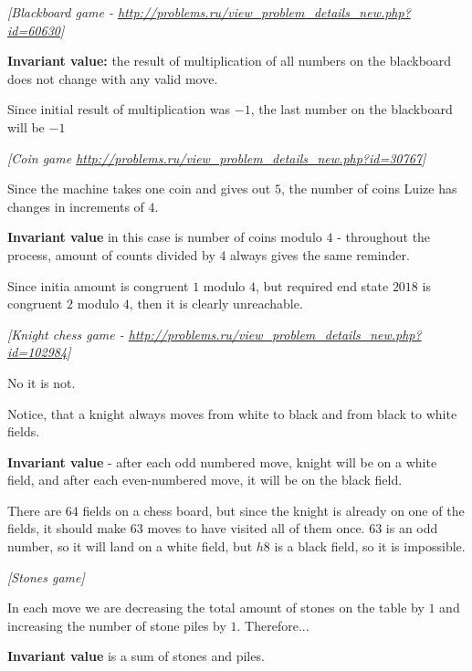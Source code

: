 

%




\noindent 
\filbreak
\begin{problem}
\textit{[Blackboard game - \url{http://problems.ru/view_problem_details_new.php?id=60630}]}

\textbf{Invariant value:} the result of multiplication of all numbers on the blackboard does not change with any valid move. 

Since initial result of multiplication was $-1$, the last number on the blackboard will be $-1$
\end{problem}
%

\begin{problem}
\textit{[Coin game \url{http://problems.ru/view_problem_details_new.php?id=30767}]}

Since the machine takes one coin and gives out $5$, the number of coins Luize has changes in increments of $4$.

\textbf{Invariant value} in this case is number of coins modulo $4$ - throughout the process, amount of counts divided by $4$ always gives the same reminder.

Since initia amount is congruent $1$ modulo $4$, but required end state $2018$ is congruent $2$ modulo $4$, then it is clearly unreachable.

 
\end{problem}
%

\begin{problem}
\textit{[Knight chess game - \url{http://problems.ru/view_problem_details_new.php?id=102984}]}

No it is not.

Notice, that a knight always moves from white to black and from black to white fields.

\textbf{Invariant value} - after each odd numbered move, knight will be on a white field, and after each even-numbered move, it will be on the black field.

There are $64$ fields on a chess board, but since the knight is already on one of the fields, it should make $63$ moves to have visited all of them once. $63$ is an odd number, so it will land on a white field, but $h8$ is a black field, so it is impossible.
\end{problem}
%
\begin{problem}
\textit{[Stones game]}

In each move we are decreasing the total amount of stones on the table by $1$ and increasing the number of stone piles by $1$. Therefore...

\textbf{Invariant value} is a sum of stones and piles. 
\end{problem}
%

